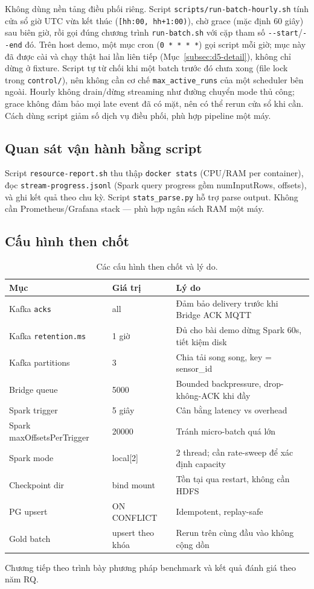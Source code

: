Không dùng nền tảng điều phối riêng. Script
\texttt{scripts/run-batch-hourly.sh} tính cửa sổ giờ UTC vừa kết thúc
(\texttt{[hh:00, hh+1:00)}), chờ grace (mặc định 60 giây) sau biên giờ, rồi gọi đúng
chương trình \texttt{run-batch.sh} với cặp tham số \texttt{-{}-start}/\texttt{-{}-end}
đó. Trên host demo, một mục cron (\texttt{0 * * * *}) gọi script mỗi giờ; mục
này đã được cài và chạy thật hai lần liên tiếp (Mục~\ref{subsec:d5-detail}),
không chỉ dừng ở fixture.
Script tự từ chối khi một batch trước đó chưa xong (file lock trong
\texttt{control/}), nên không cần cơ chế \texttt{max\_active\_runs} của một
scheduler bên ngoài. Hourly không drain/dừng streaming như đường chuyển mode thủ công; grace
không đảm bảo mọi late event đã có mặt, nên có thể rerun cửa sổ khi cần.
Cách dùng script giảm số dịch vụ điều phối, phù hợp pipeline một máy.

\subsection{Quan sát vận hành bằng script}
\label{subsec:observability-script}

Script \texttt{resource-report.sh} thu thập \texttt{docker stats} (CPU/RAM per
container), đọc \texttt{stream-progress.jsonl} (Spark query progress gồm
numInputRows, offsets), và ghi kết quả theo chu kỳ. Script
\texttt{stats\_parse.py} hỗ trợ parse output. Không cần Prometheus/Grafana
stack --- phù hợp ngân sách RAM một máy.

\subsection{Cấu hình then chốt}

\begin{table}[H]
\centering
\caption{Các cấu hình then chốt và lý do.}
\label{tab:configs}
\begin{tabularx}{\textwidth}{l l X}
\toprule
\textbf{Mục} & \textbf{Giá trị} & \textbf{Lý do} \\
\midrule
Kafka \texttt{acks} & all & Đảm bảo delivery trước khi Bridge ACK MQTT \\
Kafka \texttt{retention.ms} & 1 giờ & Đủ cho bài demo dừng Spark 60s, tiết kiệm disk \\
Kafka partitions & 3 & Chia tải song song, key = sensor\_id \\
Bridge queue & 5000 & Bounded backpressure, drop-không-ACK khi đầy \\
Spark trigger & 5 giây & Cân bằng latency vs overhead \\
Spark maxOffsetsPerTrigger & 20000 & Tránh micro-batch quá lớn \\
Spark mode & local{[}2{]} & 2 thread; cần rate-sweep để xác định capacity \\
Checkpoint dir & bind mount & Tồn tại qua restart, không cần HDFS \\
PG upsert & ON CONFLICT & Idempotent, replay-safe \\
Gold batch & upsert theo khóa & Rerun trên cùng đầu vào không cộng dồn \\
\bottomrule
\end{tabularx}
\end{table}

Chương tiếp theo trình bày phương pháp benchmark và kết quả đánh giá theo năm RQ.
